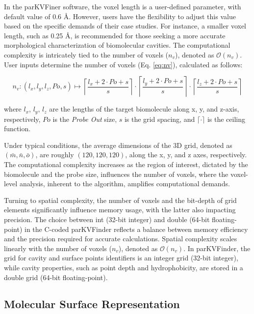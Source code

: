 \documentclass[Ingles]{phdthesis}
\begin{document}
In the parKVFiner software, the voxel length is a user-defined parameter, with default value of 0.6 Å. However, users have the flexibility to adjust this value based on the specific demands of their case studies. For instance, a smaller voxel length, such as 0.25 Å, is recommended for those seeking a more accurate morphological characterization of biomolecular cavities. The computational complexity is intricately tied to the number of voxels ($n_v$), denoted as $\mathcal{O}(n_v)$. User inputs determine the number of voxels (Eq. \ref{eq:nv}), calculated as follows:

\begin{equation}
  n_v \colon (l_x,l_y,l_z,Po,s) \mapsto \left \lceil \frac{l_x + 2 \cdot Po + s}{s} \right \rceil \cdot \left \lceil \frac{l_y + 2 \cdot Po + s}{s} \right \rceil \cdot \left \lceil \frac{l_z + 2 \cdot Po + s}{s} \right \rceil
  \label{eq:nv}
\end{equation}

\noindent where $l_x$, $l_y$, $l_z$ are the lengths of the target biomolecule along x, y, and z-axis, respectively, $Po$ is the \textit{Probe Out} size, $s$ is the grid spacing, and $\lceil \cdot \rceil$ is the ceiling function.

Under typical conditions, the average dimensions of the \acs{3D} grid, denoted as $(\bar{m},\bar{n},\bar{o})$, are roughly $(120,120,120)$, along the x, y, and z axes, respectively. The computational complexity increases as the region of interest, dictated by the biomolecule and the probe size, influences the number of voxels, where the voxel-level analysis, inherent to the algorithm, amplifies computational demands.

Turning to spatial complexity, the number of voxels and the bit-depth of grid elements significantly influence memory usage, with the latter also impacting precision. The choice between int (32-bit integer) and double (64-bit floating-point) in the C-coded parKVFinder reflects a balance between memory efficiency and the precision required for accurate calculations. Spatial complexity scales linearly with the number of voxels ($n_v$), denoted as $\mathcal{O}(n_v)$. In parKVFinder, the grid for cavity and surface points identifiers is an integer grid (32-bit integer), while cavity properties, such as point depth and hydrophobicity, are stored in a double grid (64-bit floating-point).

\subsection{Molecular Surface Representation}
\end{document}
